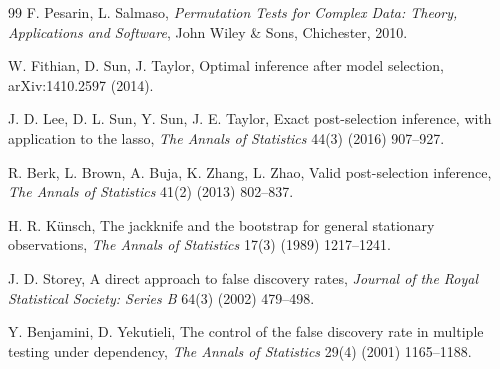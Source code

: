 \documentclass[preprint,12pt]{elsarticle}
\theoremstyle{definition}
\begin{document}
\begin{thebibliography}{99}
F. Pesarin, L. Salmaso, \emph{Permutation Tests for Complex Data: Theory, Applications and Software}, John Wiley \& Sons, Chichester, 2010.

W. Fithian, D. Sun, J. Taylor, Optimal inference after model selection,
arXiv:1410.2597 (2014).

J. D. Lee, D. L. Sun, Y. Sun, J. E. Taylor, Exact post-selection inference, with application to the lasso,
\emph{The Annals of Statistics} 44(3) (2016) 907--927.

R. Berk, L. Brown, A. Buja, K. Zhang, L. Zhao, Valid post-selection inference,
\emph{The Annals of Statistics} 41(2) (2013) 802--837.

H. R. K\"unsch, The jackknife and the bootstrap for general stationary observations,
\emph{The Annals of Statistics} 17(3) (1989) 1217--1241.

J. D. Storey, A direct approach to false discovery rates,
\emph{Journal of the Royal Statistical Society: Series B} 64(3) (2002) 479--498.

Y. Benjamini, D. Yekutieli, The control of the false discovery rate in multiple testing under dependency,
\emph{The Annals of Statistics} 29(4) (2001) 1165--1188.

\end{thebibliography}
\end{document}

